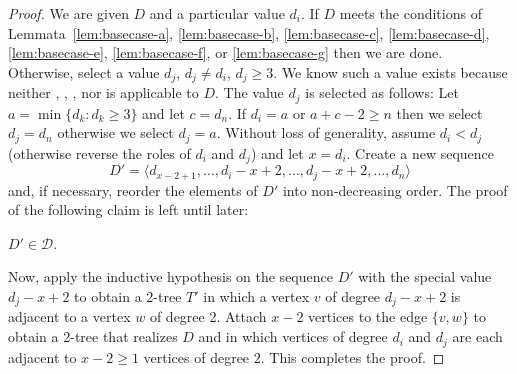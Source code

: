\documentclass[lotsofwhite,charterfonts]{patmorin}
\begin{document}
\begin{proof}

We are given $D$ and a particular value $d_i$. If $D$ meets the
conditions of Lemmata~\ref{lem:basecase-a}, \ref{lem:basecase-b},
\ref{lem:basecase-c}, \ref{lem:basecase-d}, \ref{lem:basecase-e},
\ref{lem:basecase-f}, or \ref{lem:basecase-g} then we are done.
Otherwise, select a value $d_j$, $d_j\neq d_i$, $d_j\ge 3$.  We know
such a value exists because neither ,
, , nor  is
applicable to $D$.  The value $d_j$ is selected as follows:  Let
$a=\min\{d_k : d_k\ge 3\}$ and let $c=d_n$.  If
$d_i=a$ or $a+c-2 \ge n$ then we select $d_j=d_n$ otherwise we select
$d_j=a$.  Without loss of generality, assume $d_i < d_j$ (otherwise
reverse the roles of $d_i$ and $d_j$) and let $x=d_i$.  Create a new
sequence 
\[  
   D'=\langle d_{x-2+1},\ldots,d_{i}-x+2,\ldots,d_{j}-x+2,\ldots,d_n \rangle
\] 
and, if necessary, reorder the elements of $D'$ into non-decreasing
order.  The proof of the following claim is left until later:

\begin{clm}
$D'\in \mathcal{D}$.
\end{clm}

Now, apply the inductive hypothesis on the sequence $D'$ with the
special value $d_j-x+2$ to obtain a 2-tree $T'$ in which a vertex $v$
of degree $d_j-x+2$ is adjacent to a vertex $w$ of degree 2.  Attach
$x-2$ vertices to the edge $\{v,w\}$ to obtain a 2-tree that realizes
$D$ and in which vertices of degree $d_i$ and $d_j$ are each adjacent
to $x-2\ge 1$ vertices of degree $2$.  This completes the proof.
\end{proof}
\end{document}
